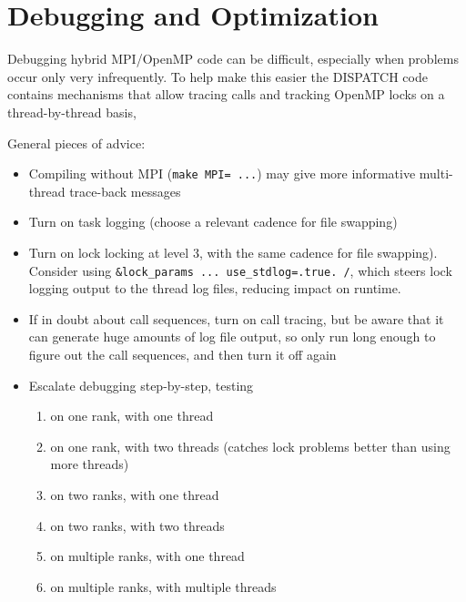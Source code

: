 \documentclass[paper=a4,fontsize=11pt]{scrartcl}
\numberwithin{equation}{section}		%
\numberwithin{figure}{section}			%
\numberwithin{table}{section}				%
\begin{document}
\section{Debugging and Optimization}
Debugging hybrid MPI/OpenMP code can be difficult, especially when problems occur only very infrequently.  To help make this easier the DISPATCH code contains mechanisms that allow tracing calls and tracking OpenMP locks on a thread-by-thread basis,

General pieces of advice:
\begin{itemize}
    \item Compiling without MPI (\verb|make MPI= ...|) may give more informative multi-thread trace-back messages
    \item Turn on task logging (choose a relevant cadence for file swapping)
    \item Turn on lock locking at level 3, with the same cadence for file swapping).  Consider using \verb|&lock_params ... use_stdlog=.true. /|, which steers lock logging output to the thread log files, reducing impact on runtime.
    \item If in doubt about call sequences, turn on call tracing, but be aware that it can generate huge amounts of log file output, so only run long enough to figure out the call sequences, and then turn it off again
    \item Escalate debugging step-by-step, testing
    \begin{enumerate}
        \item on one rank, with one thread
        \item on one rank, with two threads (catches lock problems better than using more threads)
        \item on two ranks, with one thread
        \item on two ranks, with two threads
        \item on multiple ranks, with one thread
        \item on multiple ranks, with multiple threads
    \end{enumerate}
\end{itemize}

\end{document}
